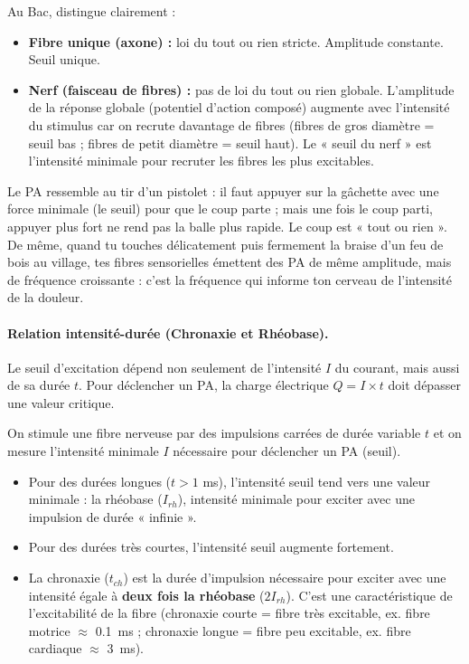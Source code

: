 \documentclass[11pt]{article}
\newcommand{\cle}[1]{{\popxbold\color{popdark}#1}}
\begin{document}
\begin{attention}
Au Bac, distingue clairement :
\begin{itemize}
\item \textbf{Fibre unique (axone) :} loi du tout ou rien stricte. Amplitude constante. Seuil unique.
\item \textbf{Nerf (faisceau de fibres) :} pas de loi du tout ou rien globale. L'amplitude de la réponse globale (potentiel d'action composé) augmente avec l'intensité du stimulus car on recrute davantage de fibres (fibres de gros diamètre = seuil bas ; fibres de petit diamètre = seuil haut). Le « seuil du nerf » est l'intensité minimale pour recruter les fibres les plus excitables.
\end{itemize}
\end{attention}

\begin{exemplebox}
Le PA ressemble au tir d'un pistolet : il faut appuyer sur la gâchette avec une force minimale (le seuil) pour que le coup parte ; mais une fois le coup parti, appuyer plus fort ne rend pas la balle plus rapide. Le coup est « tout ou rien ». De même, quand tu touches délicatement puis fermement la braise d'un feu de bois au village, tes fibres sensorielles émettent des PA de même amplitude, mais de fréquence croissante : c'est la fréquence qui informe ton cerveau de l'intensité de la douleur.
\end{exemplebox}

\paragraph{Relation intensité-durée (Chronaxie et Rhéobase).}
Le seuil d'excitation dépend non seulement de l'intensité $I$ du courant, mais aussi de sa durée $t$. Pour déclencher un PA, la charge électrique $Q = I \times t$ doit dépasser une valeur critique.

\begin{experience}
On stimule une fibre nerveuse par des impulsions carrées de durée variable $t$ et on mesure l'intensité minimale $I$ nécessaire pour déclencher un PA (seuil).
\begin{itemize}
\item Pour des durées longues ($t > 1$ ms), l'intensité seuil tend vers une valeur minimale : la \cle{rhéobase} ($I_{rh}$), intensité minimale pour exciter avec une impulsion de durée « infinie ».
\item Pour des durées très courtes, l'intensité seuil augmente fortement.
\item La \cle{chronaxie} ($t_{ch}$) est la durée d'impulsion nécessaire pour exciter avec une intensité égale à \textbf{deux fois la rhéobase} ($2 I_{rh}$). C'est une caractéristique de l'excitabilité de la fibre (chronaxie courte = fibre très excitable, ex. fibre motrice $\approx$ \SI{0,1}{ms} ; chronaxie longue = fibre peu excitable, ex. fibre cardiaque $\approx$ \SI{3}{ms}).
\end{itemize}
\end{experience}
\end{document}
